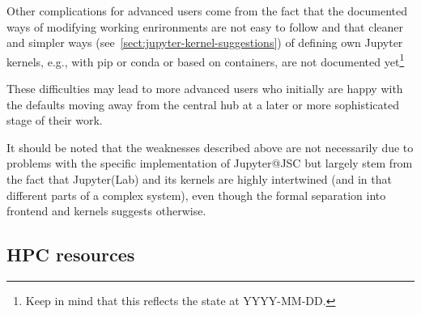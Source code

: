 Other complications for advanced users come from the fact that the documented ways of modifying working enrironments are not easy to follow and that cleaner and simpler ways (see~\ref{sect:jupyter-kernel-suggestions}) of defining own Jupyter kernels, e.g., with pip or conda or based on containers, are not documented yet\footnote{Keep in mind that this reflects the state at YYYY-MM-DD.}

These difficulties may lead to more advanced users who initially are happy with the defaults moving away from the central hub at a later or more sophisticated stage of their work.

It should be noted that the weaknesses described above are not necessarily due to problems with the specific implementation of Jupyter@JSC but largely stem from the fact that Jupyter(Lab) and its kernels are highly intertwined (and in that different parts of a complex system), even though the formal separation into frontend and kernels suggests otherwise.

\subsection{HPC resources}


